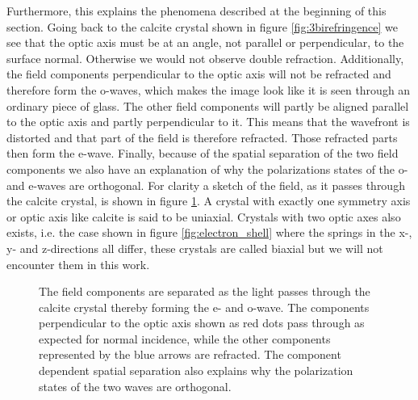 Furthermore, this explains the phenomena described at the beginning of this section. Going back to the calcite crystal shown in figure \ref{fig:3birefringence} we see that the optic axis must be at an angle, not parallel or perpendicular, to the surface normal. Otherwise we would not observe double refraction. Additionally, the field components perpendicular to the optic axis will not be refracted and therefore form the o-waves, which makes the image look like it is seen through an ordinary piece of glass. The other field components will partly be aligned parallel to the optic axis and partly perpendicular to it. This means that the wavefront is distorted and that part of the field is therefore refracted. Those refracted parts then form the e-wave. Finally, because of the spatial separation of the two field components we also have an explanation of why the polarizations states of the o- and e-waves are orthogonal. For clarity a sketch of the field, as it passes through the calcite crystal, is shown in figure \ref{fig:calcite_beams}. A crystal with exactly one symmetry axis or optic axis like calcite is said to be uniaxial. Crystals with two optic axes also exists, i.e. the case shown in figure \ref{fig:electron_shell} where the springs in the x-, y- and z-directions all differ, these crystals are called biaxial but we will not encounter them in this work. 

\begin{figure}[h]
    \centering
    
    \caption{The field components are separated as the light passes through the calcite crystal thereby forming the e- and o-wave. The components perpendicular to the optic axis shown as red dots pass through as expected for normal incidence, while the other components represented by the blue arrows are refracted. The component dependent spatial separation also explains why the polarization states of the two waves are orthogonal.}
    \label{fig:calcite_beams}
\end{figure}


